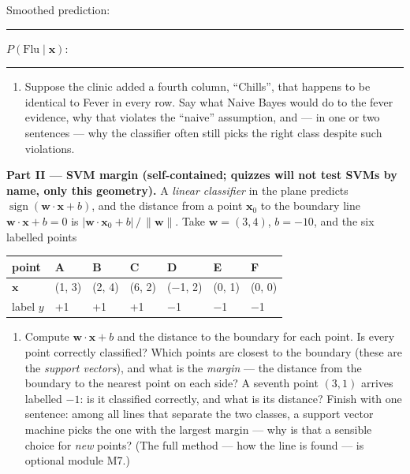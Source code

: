 \documentclass[
  11pt,
]{article}
\newcounter{none} %
\providecommand{\tightlist}{%
  \setlength{\itemsep}{0pt}\setlength{\parskip}{0pt}}
\newcommand{\answerspace}[1]{\par\vspace*{#1}}  %
\newcommand{\blank}[1][1.2in]{\rule{#1}{0.4pt}}
\begin{document}
Smoothed prediction:
\blank[0.8in]\quad \(P(\text{Flu} \mid \mathbf{x})\): \blank[0.8in]

\answerspace{2.4in}

\begin{enumerate}
\def\labelenumi{(\alph{enumi})}
\setcounter{enumi}{2}
\tightlist
\item
  Suppose the clinic added a fourth column, ``Chills'', that happens to
  be identical to Fever in every row. Say what Naive Bayes would do to
  the fever evidence, why that violates the ``naive'' assumption, and
  --- in one or two sentences --- why the classifier often still picks
  the right class despite such violations.
\end{enumerate}

\answerspace{1.8in}

\textbf{Part II --- SVM margin (self-contained; quizzes will not test
SVMs by name, only this geometry).} A \emph{linear classifier} in the
plane predicts \(\operatorname{sign}(\mathbf{w}\cdot\mathbf{x} + b)\),
and the distance from a point \(\mathbf{x}_0\) to the boundary line
\(\mathbf{w}\cdot\mathbf{x} + b = 0\) is
\(|\mathbf{w}\cdot\mathbf{x}_0 + b| \,/\, \lVert\mathbf{w}\rVert\). Take
\(\mathbf{w} = (3, 4)\), \(b = -10\), and the six labelled points

{\def\LTcaptype{none} %
\begin{longtable}[]{@{}lllllll@{}}
\toprule\noalign{}
point & A & B & C & D & E & F \\
\midrule\noalign{}
\endhead
\bottomrule\noalign{}
\endlastfoot
\(\mathbf{x}\) & (1, 3) & (2, 4) & (6, 2) & (−1, 2) & (0, 1) & (0, 0) \\
label \(y\) & +1 & +1 & +1 & −1 & −1 & −1 \\
\end{longtable}
}

\begin{enumerate}
\def\labelenumi{(\alph{enumi})}
\setcounter{enumi}{3}
\tightlist
\item
  Compute \(\mathbf{w}\cdot\mathbf{x} + b\) and the distance to the
  boundary for each point. Is every point correctly classified? Which
  points are closest to the boundary (these are the \emph{support
  vectors}), and what is the \emph{margin} --- the distance from the
  boundary to the nearest point on each side? A seventh point \((3, 1)\)
  arrives labelled \(-1\): is it classified correctly, and what is its
  distance? Finish with one sentence: among all lines that separate the
  two classes, a support vector machine picks the one with the largest
  margin --- why is that a sensible choice for \emph{new} points? (The
  full method --- how the line is found --- is optional module M7.)
\end{enumerate}
\end{document}
